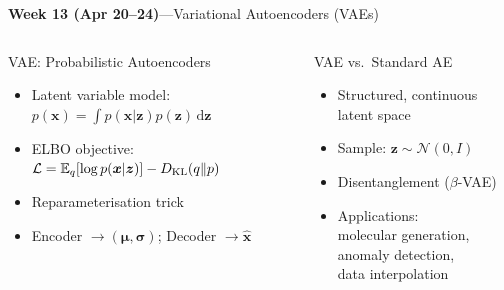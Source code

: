 \documentclass[aspectratio=169,11pt]{beamer}
\begin{document}
\begin{frame}{{\color{mlgold}\textbf{Week 13 (Apr 20--24)}\;---\;Variational Autoencoders (VAEs)}}
  \begin{columns}[T]
      \begin{block}{VAE: Probabilistic Autoencoders}
        \begin{itemize}\itemsep1pt
          \item Latent variable model:
                $p(\bm{x})=\int p(\bm{x}|\bm{z})p(\bm{z})\,\mathrm{d}\bm{z}$
          \item ELBO objective:
                $\mathcal{L} = \mathbb{E}_{q}[\log p(\bm{x}|\bm{z})]
                              - D_{\rm KL}(q\|p)$
          \item Reparameterisation trick
          \item Encoder $\to (\bm\mu,\bm\sigma)$;
                Decoder $\to\hat{\bm{x}}$
        \end{itemize}
      \end{block}
      \begin{block}{VAE vs.\ Standard AE}
        \begin{itemize}\itemsep1pt
          \item Structured, continuous latent space
          \item Sample: $\bm{z}\sim\mathcal{N}(0,I)$
          \item Disentanglement ($\beta$-VAE)
          \item Applications:\\
                molecular generation,\\
                anomaly detection,\\
                data interpolation
        \end{itemize}
      \end{block}
  \end{columns}
\end{frame}
\end{document}
